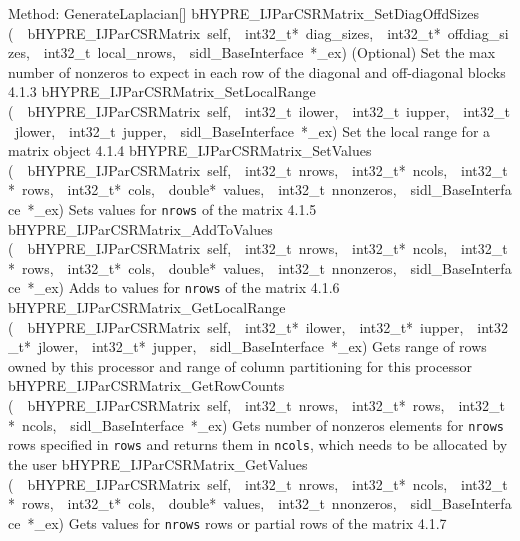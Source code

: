 \documentclass{article}
\begin{document}
\begin{cxxentry}
\begin{cxxentry}
\begin{cxxnames}
        {
Method:  GenerateLaplacian[]}
        {}
\label{cxx.4.1.20}
        {bHYPRE\_IJParCSRMatrix\_SetDiagOffdSizes}
        {(\ \ bHYPRE\_IJParCSRMatrix\ self,\ \ int32\_t*\ diag\_sizes,\ \ int32\_t*\ offdiag\_sizes,\ \ int32\_t\ local\_nrows,\ \ sidl\_BaseInterface\ *\_ex)}
        {
(Optional) Set the max number of nonzeros to expect in each
row of the diagonal and off-diagonal blocks}
        {4.1.3}
        {bHYPRE\_IJParCSRMatrix\_SetLocalRange}
        {(\ \ bHYPRE\_IJParCSRMatrix\ self,\ \ int32\_t\ ilower,\ \ int32\_t\ iupper,\ \ int32\_t\ jlower,\ \ int32\_t\ jupper,\ \ sidl\_BaseInterface\ *\_ex)}
        {
Set the local range for a matrix object}
        {4.1.4}
        {bHYPRE\_IJParCSRMatrix\_SetValues}
        {(\ \ bHYPRE\_IJParCSRMatrix\ self,\ \ int32\_t\ nrows,\ \ int32\_t*\ ncols,\ \ int32\_t*\ rows,\ \ int32\_t*\ cols,\ \ double*\ values,\ \ int32\_t\ nnonzeros,\ \ sidl\_BaseInterface\ *\_ex)}
        {
Sets values for {\tt nrows} of the matrix}
        {4.1.5}
        {bHYPRE\_IJParCSRMatrix\_AddToValues}
        {(\ \ bHYPRE\_IJParCSRMatrix\ self,\ \ int32\_t\ nrows,\ \ int32\_t*\ ncols,\ \ int32\_t*\ rows,\ \ int32\_t*\ cols,\ \ double*\ values,\ \ int32\_t\ nnonzeros,\ \ sidl\_BaseInterface\ *\_ex)}
        {
Adds to values for {\tt nrows} of the matrix}
        {4.1.6}
        {bHYPRE\_IJParCSRMatrix\_GetLocalRange}
        {(\ \ bHYPRE\_IJParCSRMatrix\ self,\ \ int32\_t*\ ilower,\ \ int32\_t*\ iupper,\ \ int32\_t*\ jlower,\ \ int32\_t*\ jupper,\ \ sidl\_BaseInterface\ *\_ex)}
        {
Gets range of rows owned by this processor and range of
column partitioning for this processor}
        {}
\label{cxx.4.1.21}
        {bHYPRE\_IJParCSRMatrix\_GetRowCounts}
        {(\ \ bHYPRE\_IJParCSRMatrix\ self,\ \ int32\_t\ nrows,\ \ int32\_t*\ rows,\ \ int32\_t*\ ncols,\ \ sidl\_BaseInterface\ *\_ex)}
        {
Gets number of nonzeros elements for {\tt nrows} rows
specified in {\tt rows} and returns them in {\tt ncols},
which needs to be allocated by the user}
        {}
\label{cxx.4.1.22}
        {bHYPRE\_IJParCSRMatrix\_GetValues}
        {(\ \ bHYPRE\_IJParCSRMatrix\ self,\ \ int32\_t\ nrows,\ \ int32\_t*\ ncols,\ \ int32\_t*\ rows,\ \ int32\_t*\ cols,\ \ double*\ values,\ \ int32\_t\ nnonzeros,\ \ sidl\_BaseInterface\ *\_ex)}
        {
Gets values for {\tt nrows} rows or partial rows of the
matrix}
        {4.1.7}

\end{cxxnames}
\end{cxxentry}
\end{cxxentry}
\end{document}

